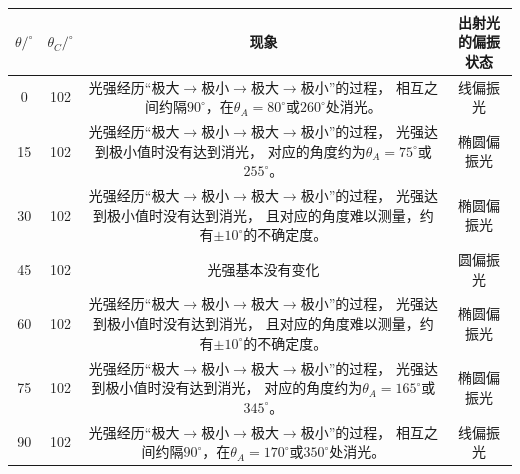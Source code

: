 \documentclass[a4paper,fontset=windows]{ctexart}
\begin{document}
{\vspace{0.5em}
\begin{table}[ht!]\linespread{1.2}\selectfont
    \begin{center}
        \begin{tabular}{ |c|c|c|c| }
            \hline
            $\theta/^\circ$ & $\theta_C/^\circ$ & 现象 & 出射光的偏振状态 \\
            \hline
            0 & 102 & \makecell[c]{光强经历“极大$\to$极小$\to$极大$\to$极小”的过程，\\ 相互之间约隔$90^\circ$，在$\theta_A = 80^\circ$或$260^\circ$处消光。} & 线偏振光 \\
            \hline
            15 & 102 & \makecell[c]{光强经历“极大$\to$极小$\to$极大$\to$极小”的过程，\\ 光强达到极小值时没有达到消光，\\ 对应的角度约为$\theta_A = 75^\circ$或$255^\circ$。} & 椭圆偏振光 \\
            \hline
            30 & 102 & \makecell[c]{光强经历“极大$\to$极小$\to$极大$\to$极小”的过程，\\ 光强达到极小值时没有达到消光，\\ 且对应的角度难以测量，约有$\pm10^\circ$的不确定度。} & 椭圆偏振光 \\
            \hline
            45 & 102 & 光强基本没有变化 & 圆偏振光 \\
            \hline
            60 & 102 & \makecell[c]{光强经历“极大$\to$极小$\to$极大$\to$极小”的过程，\\ 光强达到极小值时没有达到消光，\\ 且对应的角度难以测量，约有$\pm10^\circ$的不确定度。} & 椭圆偏振光 \\
            \hline
            75 & 102 & \makecell[c]{光强经历“极大$\to$极小$\to$极大$\to$极小”的过程，\\ 光强达到极小值时没有达到消光，\\ 对应的角度约为$\theta_A = 165^\circ$或$345^\circ$。} & 椭圆偏振光 \\
            \hline
            90 & 102 & \makecell[c]{光强经历“极大$\to$极小$\to$极大$\to$极小”的过程，\\ 相互之间约隔$90^\circ$，在$\theta_A = 170^\circ$或$350^\circ$处消光。} & 线偏振光 \\
            \hline
        \end{tabular}
    \end{center}
\end{table}\vspace{-0.5em}

}
\end{document}
